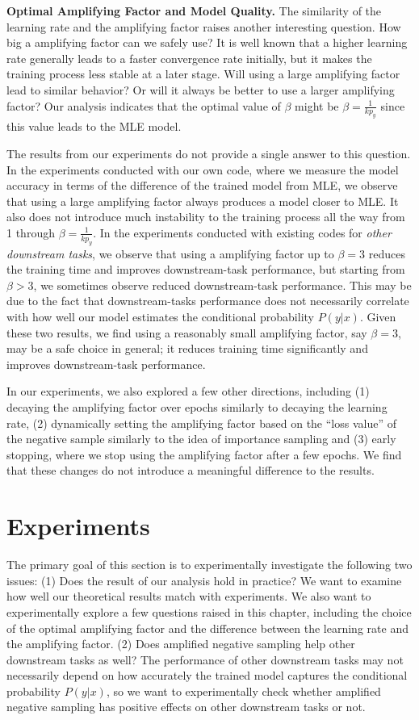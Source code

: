 \textbf{Optimal Amplifying Factor and Model Quality.} The similarity of the learning rate and the amplifying factor raises another interesting question. How big a amplifying factor can we safely use? It is well known that a higher learning rate generally leads to a faster convergence rate initially, but it makes the training process less stable at a later stage. Will using a large amplifying factor lead to similar behavior? Or will it always be better to use a larger amplifying factor? Our analysis indicates that the optimal value of $\beta$ might be $\beta = \frac{1}{k p_y}$ since this value leads to the MLE model. 

The results from our experiments do not provide a single answer to this question. In the experiments conducted with our own code, where we measure the model accuracy in terms of the difference of the trained model from MLE, we observe that using a large amplifying factor always produces a model closer to MLE. It also does not introduce much instability to the training process all the way from 1 through $\beta = \frac{1}{k p_y}$. In the experiments conducted with existing codes for \emph{other downstream tasks}, we observe that using a amplifying factor up to $\beta = 3$ reduces the training time and improves downstream-task performance, but starting from $\beta > 3$, we sometimes observe reduced downstream-task performance. This may be due to the fact that downstream-tasks performance does not necessarily correlate with how well our model estimates the conditional probability $P(y|x)$. Given these two results, we find using a reasonably small amplifying factor, say $\beta = 3$, may be a safe choice in general; it reduces training time significantly and improves downstream-task performance.

In our experiments, we also explored a few other directions, including (1) decaying the amplifying factor over epochs similarly to decaying the learning rate, (2) dynamically setting the amplifying factor based on the ``loss value'' of the negative sample similarly to the idea of importance sampling and (3) early stopping, where we stop using the amplifying factor after a few epochs. We find that these changes do not introduce a meaningful difference to the results. 
\section{Experiments}
\label{sec:NS:exp}

The primary goal of this section is to experimentally investigate the following two issues: (1) Does the result of our analysis hold in practice? We want to examine how well our theoretical results match with experiments. We also want to experimentally explore a few questions raised in this chapter, including the choice of the optimal amplifying factor and the difference between the learning rate and the amplifying factor. (2) Does amplified negative sampling help other downstream tasks as well? The performance of other downstream tasks may not necessarily depend on how accurately the trained model captures the conditional probability $P(y|x)$, so we want to experimentally check whether amplified negative sampling has positive effects on other downstream tasks or not. 

